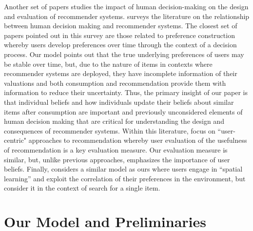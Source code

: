 \documentclass[format=acmsmall, review=false]{acmart}
\begin{document}
Another set of papers studies the impact of human decision-making on the design and evaluation of recommender systems. \cite{chen2013human} surveys the literature on the relationship between human decision making and recommender systems. The closest set of papers pointed out in this survey are those related to preference construction \cite{bettman1998constructive, lichtenstein2006construction} whereby users develop preferences over time through the context of a decision process. Our model points out that the true underlying preferences of users may be stable over time, but, due to the nature of items in contexts where recommender systems are deployed, they have incomplete information of their valuations and both consumption and recommendation provide them with information to reduce their uncertainty. Thus, the primary insight of our paper is that individual beliefs and how individuals update their beliefs about similar items after consumption are important and previously unconsidered elements of human decision making that are critical for understanding the design and consequences of recommender systems. Within this literature, \cite{celma2008new, cremonesi2013user, pu2011user} focus on ``user-centric" approaches to recommendation whereby user evaluation of the usefulness of recommendation is a key evaluation measure. Our evaluation measure is similar, but, unlike previous approaches, emphasizes the importance of user beliefs. Finally, \cite{hodgson2019horse} considers a similar model as ours where users engage in ``spatial learning'' and exploit the correlation of their preferences in the environment, but consider it in the context of search for a single item.

\section{Our Model and Preliminaries}
\end{document}
